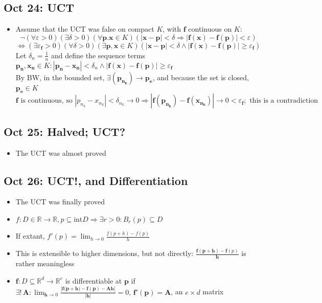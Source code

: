 \documentclass[10pt, oneside]{article}
\let\geq\geqslant
\let\ep\varepsilon
\let\de\delta
\newcommand{\R}{\mathbb{R}}
\renewcommand{\vec}[1]{\mathbf{#1}}
\newcommand{\vecf}[1]{\boldsymbol{#1}}
\newcommand{\mat}[1]{\mathbf{#1}}
\begin{document}
\subsection{Oct 24: UCT}
\begin{itemize}
    \item Assume that the UCT was false on compact $K$, with $\vecf{f}$ continuous on $K$:
        \[\lnot (\forall \ep > 0)(\exists \de > 0)(\forall \vec{p}. \vec{x} \in K) (|\vec{x} - \vec{p}| < \de \Rightarrow |\vecf{f}(\vec{x}) - \vecf{f}(\vec{p})| < \ep)\]
        \[\Leftrightarrow (\exists \ep_{\vecf{f}} > 0)(\forall \de > 0)(\exists \vec{p}, \vec{x} \in K)(|\vec{x} - \vec{p}| < \de \land |\vecf{f}(\vec{x}) - \vecf{f}(\vec{p})| \geq \ep_{\vecf{f}})\]
        Let $\de_n = \frac{1}{n}$ and define the sequence terms $\vec{p_n}, \vec{x_n} \in K : |\vec{p_n} - \vec{x_n}| < \de_n \land  |\vecf{f}(\vec{x}) - \vecf{f}(\vec{p})| \geq \ep_{\vecf{f}}$\\
        By BW, in the bounded set, $\exists (\vec{p_{n_k}}) \rightarrow \vec{p_e}
        $, and because the set is closed, $\vec{p_e} \in K$\\
        $\vecf{f} \text{ is continuous, so } |p_{n_k} - x_{n_k}| < \de_{n_k} \rightarrow 0 \Rightarrow |\vecf{f}(\vec{p_{n_k}}) - \vecf{f}(\vec{x_{n_k}})| \rightarrow 0 < \ep_{\vecf{f}}; \text{ this is a contradiction}$
\end{itemize}

\subsection{Oct 25: Halved; UCT?}
\begin{itemize}
    \item The UCT was almost proved
\end{itemize}

\subsection{Oct 26: UCT!, and Differentiation}
\begin{itemize}
    \item The UCT was finally proved
    \item $f : D \in \R \rightarrow \R, p \subseteq \text{int} D \Rightarrow \exists r > 0 : B_r(p) \subseteq D$
    \item If extant, $\displaystyle f'(p) = \lim_{h \rightarrow 0} \frac{f(p+h) - f(p)}{h}$
    \item This is extensible to higher dimensions, but not directly: $\displaystyle \frac{\vecf{f}(\vec{p} + \vec{h}) - \vecf{f}(p)}{\vec{h}}$ is rather meaningless
    \item $\vecf{f} : D \subseteq \R^d \rightarrow \R^e$ is differentiable at $\vec{p}$ if $\displaystyle \exists! \, \mat{A} : \lim_{\vec{h} \rightarrow 0} \frac{|\vecf{f}({\vec{p} + \vec{h}) - \vecf{f}(\vec{p}) - \mat{A}\vec{h} }|}{|\vec{h}|} = 0, \, \vecf{f}'(\vec{p}) = \mat{A}$, an $e \times d$ matrix 
\end{itemize}
\end{document}
